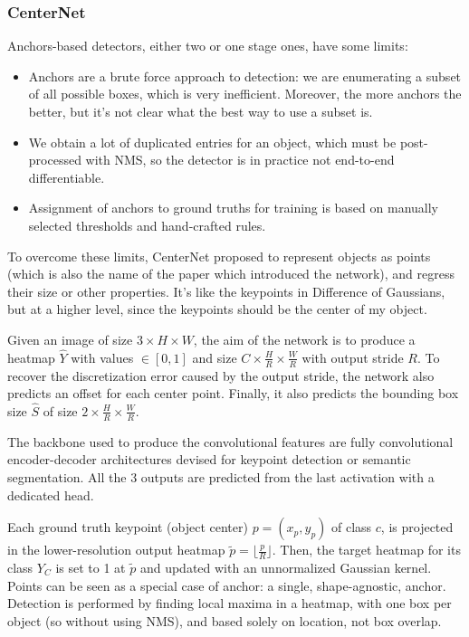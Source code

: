 \subsubsection{CenterNet}
Anchors-based detectors, either two or one stage ones, have some limits:
\begin{itemize}
  \item Anchors are a brute force approach to detection: we are enumerating a subset of all possible boxes, which is very inefficient.
  Moreover, the more anchors the better, but it's not clear what the best way to use a subset is.
  \item We obtain a lot of duplicated entries for an object, which must be post-processed with NMS, so the detector is in practice not end-to-end differentiable.
  \item Assignment of anchors to ground truths for training is based on manually selected thresholds and hand-crafted rules.
\end{itemize}

To overcome these limits, CenterNet proposed to represent objects as points (which is also the name of the paper which introduced the network), and regress their size or other properties.
It's like the keypoints in Difference of Gaussians, but at a higher level, since the keypoints should be the center of my object.

Given an image of size $3 \times H \times W$, the aim of the network is to produce a heatmap $\hat{Y}$ with values $\in [0,1]$ and size $C \times \frac{H}{R} \times \frac{W}{R}$ with output stride $R$.
To recover the discretization error caused by the output stride, the network also predicts an offset for each center point.
Finally, it also predicts the bounding box size $\hat{S}$ of size $2 \times \frac{H}{R} \times \frac{W}{R}$.

The backbone used to produce the convolutional features are fully convolutional encoder-decoder architectures devised for keypoint detection or semantic segmentation.
All the 3 outputs are predicted from the last activation with a dedicated head.

Each ground truth keypoint (object center) $p = (x_p, y_p)$ of class $c$, is projected in the lower-resolution output heatmap $\tilde{p} = \lfloor \frac{p}{R} \rfloor$.
Then, the target heatmap for its class $Y_C$ is set to 1 at $\tilde{p}$ and updated with an unnormalized Gaussian kernel.
Points can be seen as a special case of anchor: a single, shape-agnostic, anchor.
Detection is performed by finding local maxima in a heatmap, with one box per object (so without using NMS), and based solely on location, not box overlap.


